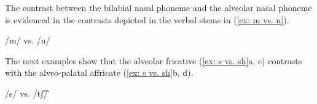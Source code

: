 The contrast between the bilabial nasal phoneme and the alveolar nasal phoneme is evidenced in the contrasts depicted in the verbal stems in (\ref{ex: m vs. n}).

\ea\label{ex: m vs. n}
{/m/ vs. /n/}

    \z
\z

The next examples show that the alveolar fricative (\ref{ex: s vs. sh}a, c) contrasts with the alveo-palatal affricate (\ref{ex: s vs. sh}b, d).


\ea\label{ex: s vs. sh}
{/s/ vs. /tʃ͡/}

